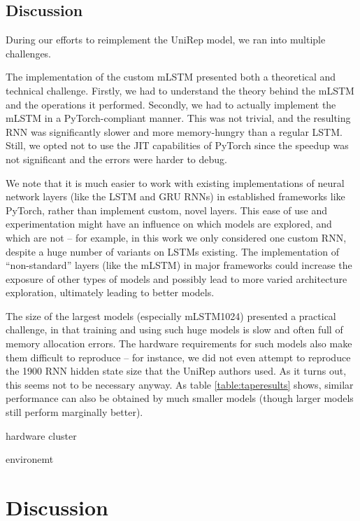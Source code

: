 \documentclass[a4paper,12pt]{article}
\begin{document}
\subsection{Discussion}
During our efforts to reimplement the UniRep model, we ran into multiple challenges.

The implementation of the custom mLSTM presented both a theoretical and technical challenge. Firstly, we had to understand the theory behind the mLSTM and the operations it performed. Secondly, we had to actually implement the mLSTM in a PyTorch-compliant manner. This was not trivial, and the resulting RNN was significantly slower and more memory-hungry than a regular LSTM. Still, we opted not to use the JIT capabilities of PyTorch since the speedup was not significant and the errors were harder to debug.

We note that it is much easier to work with existing implementations of neural network layers (like the LSTM and GRU RNNs) in established frameworks like PyTorch, rather than implement custom, novel layers. This ease of use and experimentation might have an influence on which models are explored, and which are not -- for example, in this work we only considered one custom RNN, despite a huge number of variants on LSTMs existing. The implementation of ``non-standard'' layers (like the mLSTM) in major frameworks could increase the exposure of other types of models and possibly lead to more varied architecture exploration, ultimately leading to better models.

The size of the largest models (especially mLSTM1024) presented a practical challenge, in that training and using such huge models is slow and often full of memory allocation errors. The hardware requirements for such models also make them difficult to reproduce -- for instance, we did not even attempt to reproduce the 1900 RNN hidden state size that the UniRep authors used. As it turns out, this seems not to be necessary anyway. As table \ref{table:taperesults} shows, similar performance can also be obtained by much smaller models (though larger models still perform marginally better).

hardware cluster

environemt

\clearpage
\section{Discussion}

\end{document}
